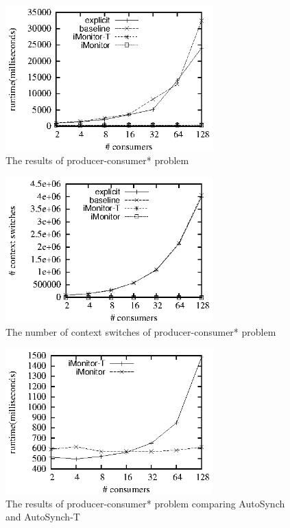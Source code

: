 \documentclass[preprint]{sigplanconf}
\begin{document}
\begin{figure}[ht!]
  \centering
  \includegraphics[width=80mm]{fig/rpc.eps}
  \caption{The results of producer-consumer* problem}
  \label{fig:rpc_eval}
\end{figure}

\begin{figure}[ht!]
  \centering
  \includegraphics[width=80mm]{fig/csrpc.eps}
  \caption{The number of context switches of producer-consumer* problem}
  \label{fig:csrpc_eval}
\end{figure}

\begin{figure}[ht!]
  \centering
  \includegraphics[width=80mm]{fig/rpch.eps}
  \caption{The results of producer-consumer* problem comparing AutoSynch and
  AutoSynch-T}
  \label{fig:rpch_eval}
\end{figure}

%
\end{document}
